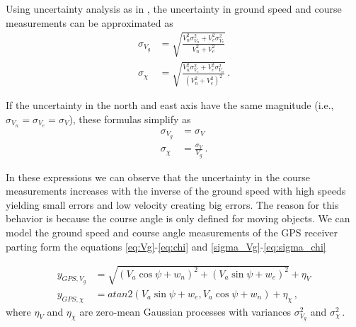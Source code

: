 Using uncertainty analysis as in \cite{Figliola2006}, the uncertainty in ground speed and course measurements can be approximated as
\begin{align*}
\sigma_{V_g}&=\sqrt{\frac{V_n^2\sigma_{V_n}^2+V_e^2\sigma_{V_e}^2}{V_n^2+V_e^2}} \\
\sigma_\chi&=\sqrt{\frac{V_n^2\sigma_{V_e}^2+V_e^2\sigma_{V_n}^2}{(V_n^2+V_e^2)^2}}\,.
\end{align*}

If the uncertainty in the north and east axis have the same magnitude (i.e., $\sigma_{V_n}=\sigma_{V_e}=\sigma_V$), these formulas simplify as
\begin{align}
\sigma_{V_g}&=\sigma_V \label{sigma_Vg}\\
\sigma_\chi&=\frac{\sigma_V}{V_g}\,. \label{eq:sigma_chi}
\end{align}

In these expressions we can observe that the uncertainty in the course measurements increases with the inverse of the ground speed with high speeds yielding small errors and low velocity creating big errors. The reason for this behavior is because the course angle is only defined for moving objects. We can model the ground speed and course angle measurements of the GPS receiver parting form the equations \ref{eq:Vg}-\ref{eq:chi} and \ref{sigma_Vg}-\ref{eq:sigma_chi}

\begin{align}
y_{GPS,V_g}&=\sqrt{(V_a\cos\psi+w_n)^2+(V_a\sin\psi+w_e)^2}+\eta_V \\
y_{GPS,\chi}&=atan2(V_a\sin\psi+w_e,V_a\cos\psi+w_n)+\eta_\chi\,,
\end{align}
where $\eta_V$ and $\eta_\chi$ are zero-mean Gaussian processes with variances $\sigma_{V_g}^2$ and $\sigma_\chi^2\,$.

